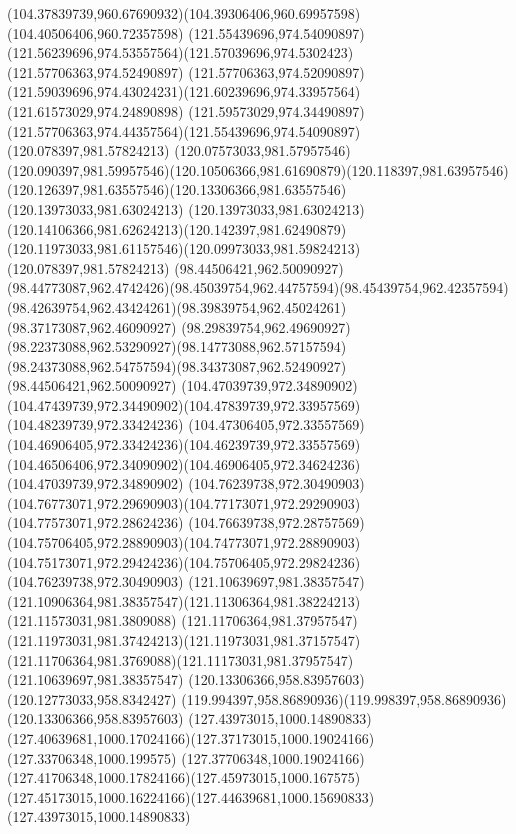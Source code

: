 {{	\curveto(104.37839739,960.67690932)(104.39306406,960.69957598)(104.40506406,960.72357598)
	\moveto(121.55439696,974.54090897)
	\curveto(121.56239696,974.53557564)(121.57039696,974.5302423)(121.57706363,974.52490897)
	\lineto(121.57706363,974.52090897)
	\curveto(121.59039696,974.43024231)(121.60239696,974.33957564)(121.61573029,974.24890898)
	\curveto(121.59573029,974.34490897)(121.57706363,974.44357564)(121.55439696,974.54090897)
	\moveto(120.078397,981.57824213)
	\lineto(120.07573033,981.57957546)
	\curveto(120.090397,981.59957546)(120.10506366,981.61690879)(120.118397,981.63957546)
	\curveto(120.126397,981.63557546)(120.13306366,981.63557546)(120.13973033,981.63024213)
	\curveto(120.13973033,981.63024213)(120.14106366,981.62624213)(120.142397,981.62490879)
	\curveto(120.11973033,981.61157546)(120.09973033,981.59824213)(120.078397,981.57824213)
	\moveto(98.44506421,962.50090927)
	\curveto(98.44773087,962.4742426)(98.45039754,962.44757594)(98.45439754,962.42357594)
	\curveto(98.42639754,962.43424261)(98.39839754,962.45024261)(98.37173087,962.46090927)
	\curveto(98.29839754,962.49690927)(98.22373088,962.53290927)(98.14773088,962.57157594)
	\curveto(98.24373088,962.54757594)(98.34373087,962.52490927)(98.44506421,962.50090927)
	\moveto(104.47039739,972.34890902)
	\curveto(104.47439739,972.34490902)(104.47839739,972.33957569)(104.48239739,972.33424236)
	\curveto(104.47306405,972.33557569)(104.46906405,972.33424236)(104.46239739,972.33557569)
	\curveto(104.46506406,972.34090902)(104.46906405,972.34624236)(104.47039739,972.34890902)
	\moveto(104.76239738,972.30490903)
	\curveto(104.76773071,972.29690903)(104.77173071,972.29290903)(104.77573071,972.28624236)
	\curveto(104.76639738,972.28757569)(104.75706405,972.28890903)(104.74773071,972.28890903)
	\curveto(104.75173071,972.29424236)(104.75706405,972.29824236)(104.76239738,972.30490903)
	\moveto(121.10639697,981.38357547)
	\curveto(121.10906364,981.38357547)(121.11306364,981.38224213)(121.11573031,981.3809088)
	\curveto(121.11706364,981.37957547)(121.11973031,981.37424213)(121.11973031,981.37157547)
	\curveto(121.11706364,981.3769088)(121.11173031,981.37957547)(121.10639697,981.38357547)
	\moveto(120.13306366,958.83957603)
	\lineto(120.12773033,958.8342427)
	\curveto(119.994397,958.86890936)(119.998397,958.86890936)(120.13306366,958.83957603)
	\moveto(127.43973015,1000.14890833)
	\curveto(127.40639681,1000.17024166)(127.37173015,1000.19024166)(127.33706348,1000.199575)
	\curveto(127.37706348,1000.19024166)(127.41706348,1000.17824166)(127.45973015,1000.167575)
	\curveto(127.45173015,1000.16224166)(127.44639681,1000.15690833)(127.43973015,1000.14890833)
}}
